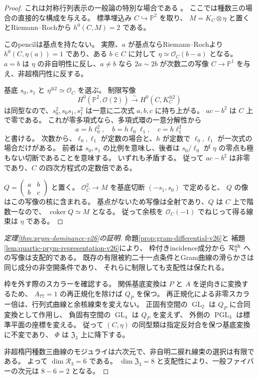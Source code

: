 \begin{proof}
これは対称行列表示の一般論の特別な場合である
\cite[\S2.3, Proposition 4.6]{BeauvilleDeterminantal}。
ここでは種数三の場合の直接的な構成を与える。
標準埋込み $C\hookrightarrow\mathbb P^2$ を取り、
$M=K_C\otimes\eta$ と置くとRiemann--Rochから $h^0(C,M)=2$ である。

このpencilは基点を持たない。
実際、$a$ が基点ならRiemann--Rochより
$h^0(C,\eta(a))=1$ であり、ある $b\in C$ に対して
$\eta\simeq\mathcal O_C(b-a)$ となる。
$a=b$ は $\eta$ の非自明性に反し、$a\ne b$ なら
$2a\sim2b$ が次数二の写像 $C\to\mathbb P^1$ を与え、非超楕円性に反する。

基底 $s_0,s_1$ と $\eta^{\otimes2}\simeq\mathcal O_C$ を選ぶ。
制限写像
\[
 H^0(\mathbb P^2,\mathcal O(2))\xrightarrow{\sim}H^0(C,K_C^{\otimes2})
\]
は同型なので、$s_0^2,s_0s_1,s_1^2$ は一意に二次式
$a,b,c$ に持ち上がる。
$ac-b^2$ は $C$ 上で零である。
これが零多項式なら、多項式環の一意分解性から
\[
 a=h\ell_0^2,\quad b=h\ell_0\ell_1,\quad c=h\ell_1^2
\]
と書ける。
次数から、$\ell_0,\ell_1$ が定数の場合と、$h$ が定数で
$\ell_0,\ell_1$ が一次式の場合だけがある。
前者は $s_0,s_1$ の比例を意味し、後者は
$s_0/\ell_0$ が $\eta$ の零点も極もない切断であることを意味する。
いずれも矛盾する。
従って $ac-b^2$ は非零であり、$C$ の四次方程式の定数倍である。

$Q=\left(\begin{smallmatrix}a&b\\b&c\end{smallmatrix}\right)$ と置く。
$\mathcal O_C^2\to M$ を基底切断 $(-s_1,s_0)$ で定めると、
$Q$ の像はこの写像の核に含まれる。
基点がないため写像は全射であり、$Q$ は $C$ 上で階数一なので、
$\operatorname{coker}Q\simeq M$ となる。
従って余核を $\mathcal O_C(-1)$ でねじって得る線束は $\eta$ である。
\end{proof}

\begin{proof}[定理\ref{thm:prym-dominance-v26}の証明]
命題\ref{prop:gram-differential-v26}と
補題\ref{lem:quartic-prym-representation-v26}により、
枠付きincidence成分から $\mathcal R_3^{\rm nh}$ への写像は支配的である。
既存の有限被約二十一点条件とGram曲線の滑らかさは同じ成分の非空開条件であり、
それらに制限しても支配性は保たれる。

枠を外す際のスカラーを確認する。
関係基底変換は $P$ と $A$ を逆向きに変換するため、
$A_{77}=1$ の再正規化を除けば $Q_P$ を保つ。
再正規化による非零スカラー倍は、行列式曲線と余核線束を変えない。
正固有空間の $\operatorname{GL}_2$ は $Q_P$ に合同変換として作用し、
負固有空間の $\operatorname{GL}_4$ は $Q_P$ を変えず、
外側の $\operatorname{PGL}_3$ は標準平面の座標を変える。
従って $(C,\eta)$ の同型類は指定反対合を保つ基底変換に不変であり、
$\Phi$ は $\mathfrak Z_3$ 上に降下する。

非超楕円種数三曲線のモジュライは六次元で、非自明二捩れ線束の選択は有限である。
よって $\dim\mathcal R_3=6$ である。
$\dim\mathfrak Z_3=8$ と支配性により、一般ファイバーの次元は $8-6=2$ となる。
\end{proof}

